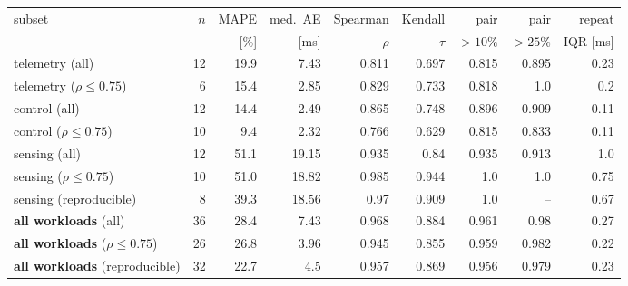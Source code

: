 \scriptsize
\setlength{\tabcolsep}{3pt}
\begin{tabular}{lrrrrrrrr}
\toprule
subset & $n$ & MAPE & med.\ AE & Spearman & Kendall & pair & pair & repeat \\
 & & [\%] & [ms] & $\rho$ & $\tau$ & $>10\%$ & $>25\%$ & IQR [ms] \\
\midrule
telemetry (all) & 12 & 19.9 & 7.43 & 0.811 & 0.697 & 0.815 & 0.895 & 0.23 \\
telemetry ($\rho\le0.75$) & 6 & 15.4 & 2.85 & 0.829 & 0.733 & 0.818 & 1.0 & 0.2 \\
control (all) & 12 & 14.4 & 2.49 & 0.865 & 0.748 & 0.896 & 0.909 & 0.11 \\
control ($\rho\le0.75$) & 10 & 9.4 & 2.32 & 0.766 & 0.629 & 0.815 & 0.833 & 0.11 \\
sensing (all) & 12 & 51.1 & 19.15 & 0.935 & 0.84 & 0.935 & 0.913 & 1.0 \\
sensing ($\rho\le0.75$) & 10 & 51.0 & 18.82 & 0.985 & 0.944 & 1.0 & 1.0 & 0.75 \\
sensing (reproducible) & 8 & 39.3 & 18.56 & 0.97 & 0.909 & 1.0 & -- & 0.67 \\
\textbf{all workloads} (all) & 36 & 28.4 & 7.43 & 0.968 & 0.884 & 0.961 & 0.98 & 0.27 \\
\textbf{all workloads} ($\rho\le0.75$) & 26 & 26.8 & 3.96 & 0.945 & 0.855 & 0.959 & 0.982 & 0.22 \\
\textbf{all workloads} (reproducible) & 32 & 22.7 & 4.5 & 0.957 & 0.869 & 0.956 & 0.979 & 0.23 \\
\bottomrule
\end{tabular}

